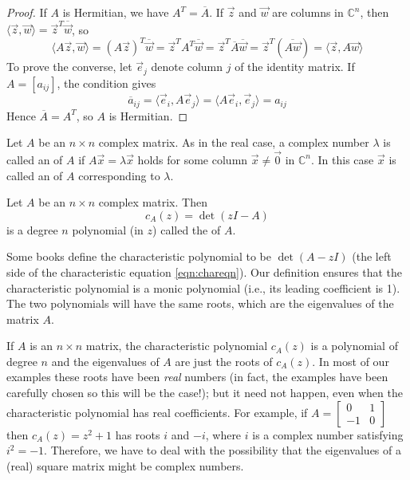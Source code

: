 \documentclass{ximera}
\begin{document}
\begin{proof}
If $A$ is Hermitian, we have $A^T = \overline{A}$. If $\vec{z}$ and $\vec{w}$ are columns in $\mathbb{C}^n$, then $\langle \vec{z}, \vec{w} \rangle = \vec{z}^T\overline{\vec{w}}$, so
\begin{equation*}
\langle A\vec{z}, \vec{w} \rangle =(A\vec{z})^T\overline{\vec{w}} = \vec{z}^TA^T\overline{\vec{w}} = \vec{z}^T\overline{A}\overline{\vec{w}} = \vec{z}^T(\overline{A\vec{w}}) = \langle \vec{z}, A\vec{w} \rangle
\end{equation*}
To prove the converse, let $\vec{e}_{j}$ denote column $j$ of the identity matrix. If $A = \left[ a_{ij} \right]$, the condition gives
\begin{equation*}
\overline{a}_{ij} = \langle \vec{e}_{i}, A\vec{e}_{j} \rangle = \langle A\vec{e}_{i}, \vec{e}_{j} \rangle = {a}_{ij}
\end{equation*}
Hence $\overline{A} = A^T$, so $A$ is Hermitian.
\end{proof}

Let $A$ be an $n \times n$ complex matrix. As in the real case, a complex number $\lambda$ is called an  of $A$ if $A\vec{x} = \lambda \vec{x}$ holds for some column $\vec{x} \neq \vec{0}$ in $\mathbb{C}^n$. In this case $\vec{x}$ is called an  of $A$ corresponding to $\lambda$. 

\begin{definition}\label{def:char_poly_complex}
Let $A$ be an $n \times n$ complex matrix.  Then $$c_{A}(z)=\det(zI-A)$$
is a degree $n$ polynomial (in $z$) called the  of $A$.
\end{definition}

\begin{remark}
Some books define the characteristic polynomial to be $\det(A-zI)$ (the left side of 
the characteristic equation \ref{eqn:chareqn}).  Our definition  ensures that the characteristic polynomial is a monic polynomial (i.e., its leading coefficient is 1).  The two polynomials will have the same roots, which are the eigenvalues of the matrix $A$.
\end{remark}
If $A$ is an $n \times n$ matrix, the characteristic polynomial $c_{A}(z)$ is a polynomial of degree $n$ and the eigenvalues of $A$ are just the roots of $c_{A}(z)$. In most of our examples these roots have been \textit{real} numbers (in fact, the examples have been carefully chosen so this will be the case!); but it need not happen, even when the characteristic polynomial has real coefficients. For example, if $A = \left[ \begin{array}{rr}
0 & 1 \\
-1 & 0
\end{array}\right]$ then $c_{A}(z) = z^{2} + 1$ has roots $i$ and $-i$, where $i$ is a complex number satisfying $i^{2} = -1$. Therefore, we have to deal with the possibility that the eigenvalues of a (real) square matrix might be complex numbers.
\end{document}
